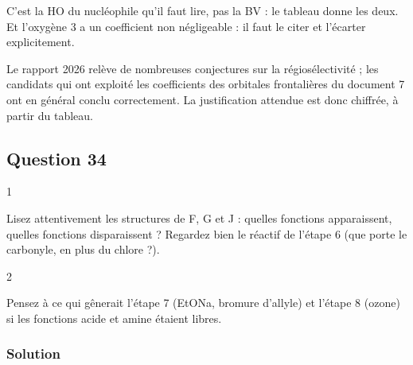 \documentclass[11pt,a4paper]{article}
\begin{document}
\begin{piege}

C'est la HO du nucléophile qu'il faut lire, pas la BV : le tableau donne les deux. Et l'oxygène 3 a un coefficient non négligeable : il faut le citer et l'écarter explicitement.

\end{piege}

\begin{jury}

Le rapport 2026 relève de nombreuses conjectures sur la régiosélectivité ; les candidats qui ont exploité les coefficients des orbitales frontalières du document 7 ont en général conclu correctement. La justification attendue est donc chiffrée, à partir du tableau.

\end{jury}

\hypertarget{question-34}{%
\subsection{Question 34}\label{question-34}}

\begin{indication}{1}

Lisez attentivement les structures de F, G et J : quelles fonctions apparaissent, quelles fonctions disparaissent ? Regardez bien le réactif de l'étape 6 (que porte le carbonyle, en plus du chlore ?).

\end{indication}

\begin{indication}{2}

Pensez à ce qui gênerait l'étape 7 (EtONa, bromure d'allyle) et l'étape 8 (ozone) si les fonctions acide et amine étaient libres.

\end{indication}

\hypertarget{solution-33}{%
\subsubsection{Solution}\label{solution-33}}
\end{document}
